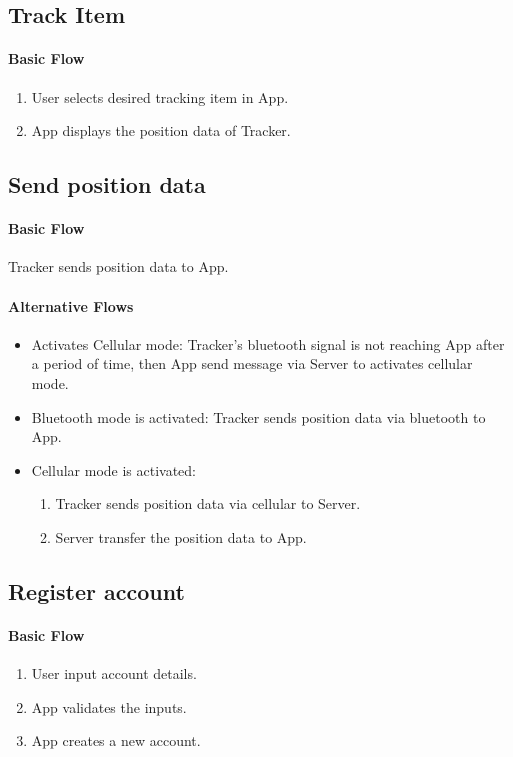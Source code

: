 \documentclass[12pt,a4paper]{article}
\begin{document}
\begin{appendices}
        \subsection{Track Item}
          \paragraph{Basic Flow}
            \begin{enumerate}
              \item User selects desired tracking item in App.
              \item App displays the position data of Tracker.
            \end{enumerate}
      
        \subsection{Send position data}
        \paragraph{Basic Flow}
          Tracker sends position data to App.
        \paragraph{Alternative Flows}
          \begin{itemize}
            \item Activates Cellular mode: Tracker's bluetooth signal is not reaching App after a period of time, then App send message via Server to activates cellular mode.
            \item Bluetooth mode is activated: Tracker sends position data via bluetooth to App.
            \item Cellular mode is activated: 
            \begin{enumerate}
              \item Tracker sends position data via cellular to Server.
              \item Server transfer the position data to App.
            \end{enumerate}    
          \end{itemize}
      
      
      \subsection{Register account}
      \paragraph{Basic Flow}
        \begin{enumerate}
          \item User input account details.
          \item App validates the inputs.
          \item App creates a new account.
        \end{enumerate}

\end{appendices}
\end{document}
